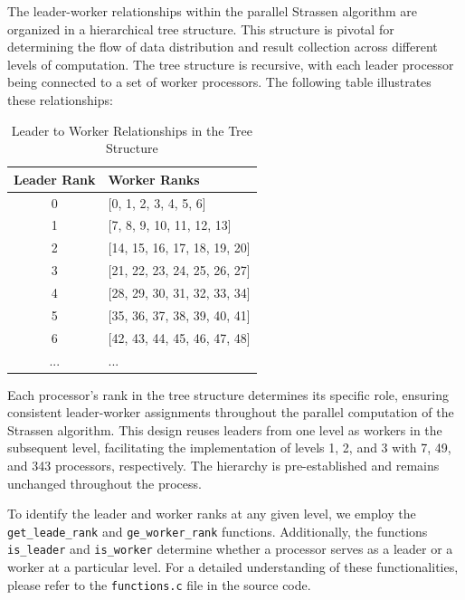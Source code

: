 \documentclass[12pt,a4paper]{article}
\begin{document}
The leader-worker relationships within the parallel Strassen algorithm are organized in a hierarchical tree structure. This structure is pivotal for determining the flow of data distribution and result collection across different levels of computation. The tree structure is recursive, with each leader processor being connected to a set of worker processors. The following table illustrates these relationships:

\begin{table}[htbp]
    \centering
    \begin{tabular}{cl}
        \toprule
        \textbf{Leader Rank} & \textbf{Worker Ranks} \\
        \midrule
        0 & [0, 1, 2, 3, 4, 5, 6] \\
        1 & [7, 8, 9, 10, 11, 12, 13] \\
        2 & [14, 15, 16, 17, 18, 19, 20] \\
        3 & [21, 22, 23, 24, 25, 26, 27] \\
        4 & [28, 29, 30, 31, 32, 33, 34] \\
        5 & [35, 36, 37, 38, 39, 40, 41] \\
        6 & [42, 43, 44, 45, 46, 47, 48] \\
        ... & ... \\
        \bottomrule
    \end{tabular}
    \caption{Leader to Worker Relationships in the Tree Structure}
    \label{tab:leader_worker_relationships}
\end{table}

Each processor's rank in the tree structure determines its specific role, ensuring consistent leader-worker assignments throughout the parallel computation of the Strassen algorithm. This design reuses leaders from one level as workers in the subsequent level, facilitating the implementation of levels 1, 2, and 3 with 7, 49, and 343 processors, respectively. The hierarchy is pre-established and remains unchanged throughout the process.

To identify the leader and worker ranks at any given level, we employ the \texttt{get\_leade\_rank} and \texttt{ge\_worker\_rank} functions. Additionally, the functions \texttt{is\_leader} and \texttt{is\_worker} determine whether a processor serves as a leader or a worker at a particular level. For a detailed understanding of these functionalities, please refer to the \texttt{functions.c} file in the source code.
\end{document}
